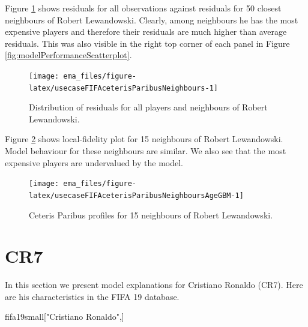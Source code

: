 \documentclass[]{krantz}
\newenvironment{Shaded}{\begin{snugshade}}{\end{snugshade}}
\newcommand{\NormalTok}[1]{#1}
\newcommand{\StringTok}[1]{\textcolor[rgb]{0.31,0.60,0.02}{#1}}
\begin{document}
Figure \ref{fig:usecaseFIFAceterisParibusNeighbours} shows residuals for all observations against residuals for 50 closest neighbours of Robert Lewandowski. Clearly, among neighbours he has the most expensive players and therefore their residuals are much higher than average residuals. This was also visible in the right top corner of each panel in Figure \ref{fig:modelPerformanceScatterplot}.

\begin{figure}

{\centering \texttt{[image: ema\_files/figure-latex/usecaseFIFAceterisParibusNeighbours-1]} 

}

\caption{Distribution of residuals for all players and neighbours of Robert Lewandowski.}\label{fig:usecaseFIFAceterisParibusNeighbours}
\end{figure}

Figure \ref{fig:usecaseFIFAceterisParibusNeighboursAgeGBM} shows local-fidelity plot for 15 neighbours of Robert Lewandowski. Model behaviour for these neighbours are similar. We also see that the most expensive players are undervalued by the model.

\begin{figure}

{\centering \texttt{[image: ema\_files/figure-latex/usecaseFIFAceterisParibusNeighboursAgeGBM-1]} 

}

\caption{Ceteris Paribus profiles for 15 neighbours of Robert Lewandowski.}\label{fig:usecaseFIFAceterisParibusNeighboursAgeGBM}
\end{figure}

\hypertarget{cr7}{%
\section{CR7}\label{cr7}}

In this section we present model explanations for Cristiano Ronaldo (CR7). Here are his characteristics in the FIFA 19 database.

\begin{Shaded}
\begin{Highlighting}[]
\NormalTok{fifa19small[}\StringTok{"Cristiano Ronaldo"}\NormalTok{,]}
\end{Highlighting}
\end{Shaded}
\end{document}
